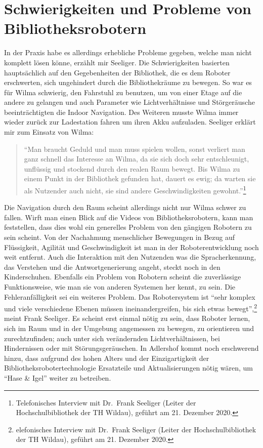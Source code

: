 \documentclass[a4paper,
fontsize=11pt,
oneside,
numbers=noperiodatend,
parskip=half-,
bibliography=totoc,
final
]{scrartcl}
\begin{document}
\hypertarget{schwierigkeiten-und-probleme-von-bibliotheksrobotern}{%
\section{Schwierigkeiten und Probleme von
Bibliotheksrobotern}\label{schwierigkeiten-und-probleme-von-bibliotheksrobotern}}

In der Praxis habe es allerdings erhebliche Probleme gegeben, welche man
nicht komplett lösen könne, erzählt mir Seeliger. Die Schwierigkeiten
basierten hauptsächlich auf den Gegebenheiten der Bibliothek, die es dem
Roboter erschwerten, sich ungehindert durch die Bibliothekräume zu
bewegen. So war es für Wilma schwierig, den Fahrstuhl zu benutzen, um
von einer Etage auf die andere zu gelangen und auch Parameter wie
Lichtverhältnisse und Störgeräusche beeinträchtigten die Indoor
Navigation. Des Weiteren musste Wilma immer wieder zurück zur
Ladestation fahren um ihren Akku aufzuladen. Seeliger erklärt mir zum
Einsatz von Wilma:

\begin{quote}
\enquote{Man braucht Geduld und man muss spielen wollen, sonst verliert
man ganz schnell das Interesse an Wilma, da sie sich doch sehr
entschleunigt, unflüssig und stockend durch den realen Raum bewegt. Bis
Wilma zu einem Punkt in der Bibliothek gefunden hat, dauert es ewig; da
warten sie als Nutzender auch nicht, sie sind andere Geschwindigkeiten
gewohnt.}\footnote{Telefonisches Interview mit Dr.~Frank Seeliger
  (Leiter der Hochschulbibliothek der TH Wildau), geführt am 21.
  Dezember 2020.}
\end{quote}

Die Navigation durch den Raum scheint allerdings nicht nur Wilma schwer
zu fallen. Wirft man einen Blick auf die Videos von Bibliotheksrobotern,
kann man feststellen, dass dies wohl ein generelles Problem von den
gängigen Robotern zu sein scheint. Von der Nachahmung menschlicher
Bewegungen in Bezug auf Flüssigkeit, Agilität und Geschwindigkeit ist
man in der Roboterentwicklung noch weit entfernt. Auch die Interaktion
mit den Nutzenden was die Spracherkennung, das Verstehen und die
Antwortgenerierung angeht, steckt noch in den Kinderschuhen. Ebenfalls
ein Problem von Robotern scheint die zuverlässige Funktionsweise, wie
man sie von anderen Systemen her kennt, zu sein. Die Fehleranfälligkeit
sei ein weiteres Problem. Das Robotersystem ist \enquote{sehr komplex
und viele verschiedene Ebenen müssen ineinandergreifen, bis sich etwas
bewegt},\footnote{elefonisches Interview mit Dr.~Frank Seeliger
  (Leiter der Hochschulbibliothek der TH Wildau), geführt am 21.
  Dezember 2020.} meint Frank Seeliger. Es scheint erst einmal
nötig zu sein, dass Roboter lernen, sich im Raum und in der Umgebung
angemessen zu bewegen, zu orientieren und zurechtzufinden; auch unter
sich verändernden Lichtverhältnissen, bei Hindernissen oder mit
Störungsgeräuschen. In Adlershof kommt noch erschwerend hinzu, dass
aufgrund des hohen Alters und der Einzigartigkeit der
Bibliotheksrobotertechnologie Ersatzteile und Aktualisierungen nötig
wären, um \enquote{Hase \& Igel} weiter zu betreiben.
\end{document}
